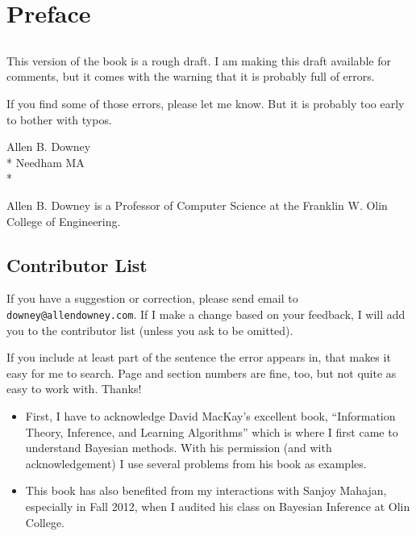 \documentclass[12pt]{book}
\begin{document}
\fi

\chapter{Preface}
\label{preface}

\section*{}

This version of the book is a rough draft.  I am making this draft
available for comments, but it comes with the warning that it is
probably full of errors.

If you find some of those errors, please let me know.  But it is
probably too early to bother with typos.

Allen B. Downey \\*
Needham MA \\*

Allen B. Downey is a Professor of Computer Science at 
the Franklin W. Olin College of Engineering.







\section*{Contributor List}

If you have a suggestion or correction, please send email to 
{\tt downey@allendowney.com}.  If I make a change based on your
feedback, I will add you to the contributor list
(unless you ask to be omitted).

If you include at least part of the sentence the
error appears in, that makes it easy for me to search.  Page and
section numbers are fine, too, but not quite as easy to work with.
Thanks!

\small

\begin{itemize}

\item First, I have to acknowledge David MacKay's excellent book,
  ``Information Theory, Inference, and Learning Algorithms'' which is
  where I first came to understand Bayesian methods.  With his
  permission (and with acknowledgement) I use several problems from
  his book as examples.

\item This book has also benefited from my interactions with Sanjoy
  Mahajan, especially in Fall 2012, when I audited his class on
  Bayesian Inference at Olin College.


\end{itemize}
\end{document}
